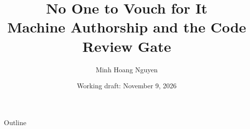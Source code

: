 \documentclass{beamer}
\title[Machine Authorship and the Review Gate]{No One to Vouch for It\\{\normalsize Machine Authorship and the Code Review Gate}}
\author[Hoang]{Minh Hoang Nguyen}
\institute[KAIST]{School of Business and Technology Management\\KAIST}
\date{Working draft: November 9, 2026}
\begin{document}
\begin{frame}[plain]
\maketitle
\end{frame}
\begin{frame}{Outline}
\tableofcontents[hideallsubsections]
\end{frame}

\end{document}
